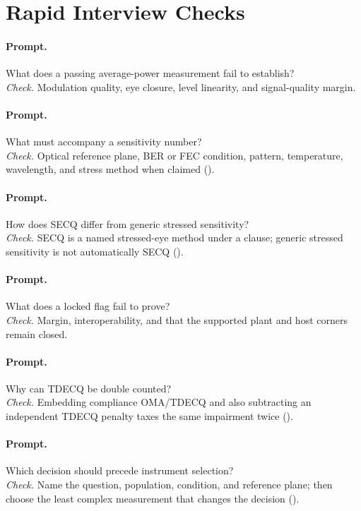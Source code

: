 \section{Rapid Interview Checks}

\paragraph{Prompt.} What does a passing average-power measurement fail to
establish?\\
\textit{Check.} Modulation quality, eye closure, level linearity, and
signal-quality margin.

\paragraph{Prompt.} What must accompany a sensitivity number?\\
\textit{Check.} Optical reference plane, BER or FEC condition, pattern,
temperature, wavelength, and stress method when claimed
().

\paragraph{Prompt.} How does SECQ differ from generic stressed sensitivity?\\
\textit{Check.} SECQ is a named stressed-eye method under a clause; generic
stressed sensitivity is not automatically SECQ ().

\paragraph{Prompt.} What does a locked flag fail to prove?\\
\textit{Check.} Margin, interoperability, and that the supported plant and host
corners remain closed.

\paragraph{Prompt.} Why can TDECQ be double counted?\\
\textit{Check.} Embedding compliance OMA/TDECQ and also subtracting an
independent TDECQ penalty taxes the same impairment twice
().

\paragraph{Prompt.} Which decision should precede instrument selection?\\
\textit{Check.} Name the question, population, condition, and reference plane;
then choose the least complex measurement that changes the decision
().

